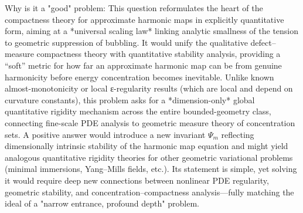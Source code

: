 Why is it a "good" problem:  
This question reformulates the heart of the compactness theory for approximate harmonic maps in explicitly quantitative form, aiming at a *universal scaling law* linking analytic smallness of the tension to geometric suppression of bubbling.  
It would unify the qualitative defect–measure compactness theory with quantitative stability analysis, providing a “soft” metric for how far an approximate harmonic map can be from genuine harmonicity before energy concentration becomes inevitable.  
Unlike known almost-monotonicity or local ε-regularity results (which are local and depend on curvature constants), this problem asks for a *dimension-only* global quantitative rigidity mechanism across the entire bounded-geometry class, connecting fine-scale PDE analysis to geometric measure theory of concentration sets.  
A positive answer would introduce a new invariant \(\Psi_m\) reflecting dimensionally intrinsic stability of the harmonic map equation and might yield analogous quantitative rigidity theories for other geometric variational problems (minimal immersions, Yang–Mills fields, etc.).  
Its statement is simple, yet solving it would require deep new connections between nonlinear PDE regularity, geometric stability, and concentration–compactness analysis—fully matching the ideal of a "narrow entrance, profound depth" problem.